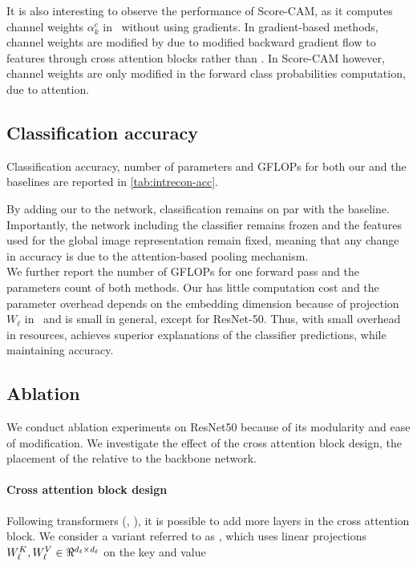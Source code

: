 \noindent It is also interesting to observe the performance of Score-CAM, as it computes channel 
weights $\alpha_k^c$ in~ without using gradients. 
In gradient-based methods, channel weights are modified by \Ours due to modified backward gradient 
flow to features through cross attention blocks rather than \gap.
In Score-CAM however, channel weights are only modified in the forward class probabilities 
computation, due to attention.

\subsection{Classification accuracy}
\label{subsec:classification}
Classification accuracy, number of parameters and GFLOPs for both our \Ours and the baselines are 
reported in \autoref{tab:intrecon-acc}.



\noindent By adding our \Ours to the network, classification remains on par with the baseline. 
Importantly, the network including the classifier remains frozen and the features used for the 
global image representation remain fixed, meaning that any change in accuracy is due to the 
attention-based pooling mechanism.\\

\noindent We further report the number of GFLOPs for one forward pass and the parameters count of 
both methods.
Our \Ours has little computation cost and the parameter overhead depends on the embedding dimension 
because of projection $W_\ell$ in~ and is small in general, except for ResNet-50. 
Thus, with small overhead in resources, \Ours achieves superior explanations of the classifier 
predictions, while maintaining accuracy.

\subsection{Ablation}
\label{sec:gen_ablation}

We conduct ablation experiments on ResNet50 because of its modularity and ease of modification. We 
investigate the effect of the cross attention block design, the placement of the \Ours relative to 
the backbone network.

\paragraph{Cross attention block design}
Following transformers (\cite{vaswani2017attention}, \cite{dosovitskiy2020image}), it is possible to 
add more layers in the cross attention block. We consider a variant referred to as \PO, which uses 
linear projections $W_\ell^K, W_\ell^V \in \real^{d_\ell \times d_\ell}$ on the key and value

